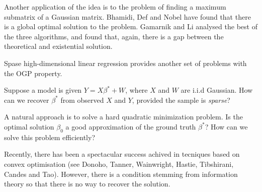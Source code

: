 \documentclass[11pt]{scrartcl}
\begin{document}
Another application of the idea is to the problem of finding a maximum
submatrix of a Gaussian matrix. Bhamidi, Def and Nobel have found that
there is a global optimal solution to the problem. Gamarnik and Li
analysed the best of the three algorithms, and found that, again,
there is a gap between the theoretical and existential solution.

Spase high-dimensional linear regression provides another set of
problems with the OGP property.

Suppose a model is given $Y = X\beta^{*}+W$, where $X$ and $W$ are
i.i.d Gaussian. How can we recover $\beta^{*}$ from observed $X$ and
$Y$, provided the sample is \textit{sparse}?

A natural approach is to solve a hard quadratic minimization
problem. Is the optimal solution $\beta_{0}$ a good approximation of
the ground truth $\beta^{*}$? How can we solve this problem
efficiently?

Recently, there has been a spectacular success achived in tecniques
based on convex optimisation (see Donoho, Tanner, Wainwright, Hastie,
Tibshirani, Candes and Tao). However, there is a condition stemming
from information theory so that there is no way to recover the
solution. 
\end{document}

